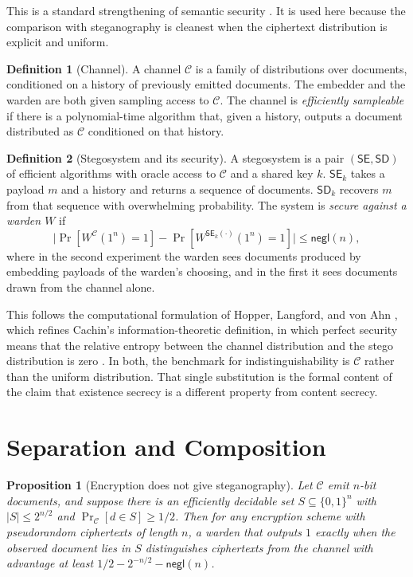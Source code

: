 \documentclass[11pt]{article}
\newtheorem{proposition}{Proposition}
\theoremstyle{definition}
\newtheorem{definition}{Definition}
\theoremstyle{remark}
\newcommand{\negl}{\mathsf{negl}}
\newcommand{\SE}{\mathsf{SE}}
\newcommand{\SD}{\mathsf{SD}}
\begin{document}
This is a standard strengthening of semantic security \cite{goldwasser1984}. It is used here because the comparison with steganography is cleanest when the ciphertext distribution is explicit and uniform.

\begin{definition}[Channel]
A channel $\mathcal{C}$ is a family of distributions over documents, conditioned on a history of previously emitted documents. The embedder and the warden are both given sampling access to $\mathcal{C}$. The channel is \emph{efficiently sampleable} if there is a polynomial-time algorithm that, given a history, outputs a document distributed as $\mathcal{C}$ conditioned on that history.
\end{definition}

\begin{definition}[Stegosystem and its security]
A stegosystem is a pair $(\SE,\SD)$ of efficient algorithms with oracle access to $\mathcal{C}$ and a shared key $k$. $\SE_k$ takes a payload $m$ and a history and returns a sequence of documents. $\SD_k$ recovers $m$ from that sequence with overwhelming probability. The system is \emph{secure against a warden $W$} if
\[
\bigl|\Pr[W^{\mathcal{C}}(1^n)=1]-\Pr[W^{\SE_k(\cdot)}(1^n)=1]\bigr|\le \negl(n),
\]
where in the second experiment the warden sees documents produced by embedding payloads of the warden's choosing, and in the first it sees documents drawn from the channel alone.
\end{definition}

This follows the computational formulation of Hopper, Langford, and von Ahn \cite{hopper2002}, which refines Cachin's information-theoretic definition, in which perfect security means that the relative entropy between the channel distribution and the stego distribution is zero \cite{cachin1998}. In both, the benchmark for indistinguishability is $\mathcal{C}$ rather than the uniform distribution. That single substitution is the formal content of the claim that existence secrecy is a different property from content secrecy.

\section{Separation and Composition}

\begin{proposition}[Encryption does not give steganography]
Let $\mathcal{C}$ emit $n$-bit documents, and suppose there is an efficiently decidable set $S\subseteq\{0,1\}^n$ with $|S|\le 2^{n/2}$ and $\Pr_{\mathcal{C}}[d\in S]\ge 1/2$. Then for any encryption scheme with pseudorandom ciphertexts of length $n$, a warden that outputs $1$ exactly when the observed document lies in $S$ distinguishes ciphertexts from the channel with advantage at least $1/2-2^{-n/2}-\negl(n)$.
\end{proposition}
\end{document}
